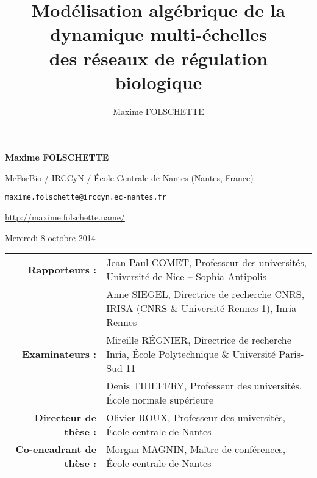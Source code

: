 \documentclass[fleqn,8pt,t]{beamer}
\date{\thedate}
\title[Modélisation algébrique de la dynamique multi-échelles des RRB]%
  {Modélisation algébrique de la dynamique multi-échelles\\des réseaux de régulation biologique}
\author{Maxime FOLSCHETTE}
\newcommand{\tval}[1]{\textbf{#1}}
\begin{document}
\begin{frame}[plain,label=title]

\begin{center}
\vfill
\textcolor{couleurtheme}{}

\par
\medskip
\bigskip
\normalsize
\tval{Maxime FOLSCHETTE}

\medskip
\footnotesize
MeForBio / IRCCyN / École Centrale de Nantes (Nantes, France)

\texttt{maxime.folschette@irccyn.ec-nantes.fr}

\url{http://maxime.folschette.name/}

\bigskip

\normalsize
Mercredi 8 octobre 2014
\end{center}

\scriptsize
\bigskip


\begin{tabular}{r@{\ \ }l}
\textbf{Rapporteurs :}
& Jean-Paul COMET, Professeur des universités,
    Université de Nice -- Sophia Antipolis \\
& Anne SIEGEL, Directrice de recherche CNRS,
    IRISA (CNRS \& Université Rennes 1), Inria Rennes \vspace*{1em} \\
\textbf{Examinateurs :}
& Mireille RÉGNIER, Directrice de recherche Inria,
    École Polytechnique \& Université Paris-Sud 11 \\
& Denis THIEFFRY, Professeur des universités,
    École normale supérieure \vspace*{1em} \\
\textbf{Directeur de thèse :}
& Olivier ROUX, Professeur des universités,
    École centrale de Nantes \\
\textbf{Co-encadrant de thèse :}
& Morgan MAGNIN, Maître de conférences,
    École centrale de Nantes
\end{tabular}

\vfill

\end{frame}
\end{document}

